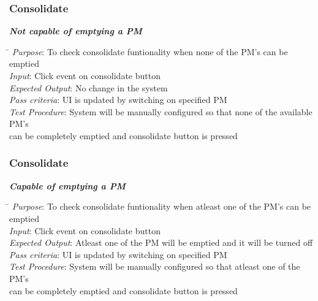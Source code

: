 \documentclass[a4paper,10pt]{article}
\begin{document}
\subsubsection{Consolidate}
\emph{\bf Not capable of emptying a PM}
\begin{tabbing}
 \hspace*{4cm}\= \kill
 \emph{Purpose}\>: To check consolidate funtionality when none of the PM's can be emptied\\
\emph{Input}\>: Click event on consolidate button\\
 \emph{Expected Output}\>: No change in the system\\
 \emph{Pass criteria}\>: UI is updated by switching on specified PM\\
 \emph{Test Procedure}\>: System will be manually configured so that none of the available PM's \\ \>can be completely emptied and consolidate 
 button is pressed\\
\end{tabbing}
\subsubsection{Consolidate}
\emph{\bf Capable of emptying a PM}
\begin{tabbing}
 \hspace*{4cm}\= \kill
 \emph{Purpose}\>: To check consolidate funtionality when atleast one of the PM's can be emptied\\
\emph{Input}\>: Click event on consolidate button\\
 \emph{Expected Output}\>: Atleast one of the PM will be emptied and it will be turned off\\
 \emph{Pass criteria}\>: UI is updated by switching on specified PM\\
 \emph{Test Procedure}\>: System will be manually configured so that atleast one of the PM's \\ \>can be completely emptied and consolidate 
 button is pressed\\
\end{tabbing}
\end{document}
